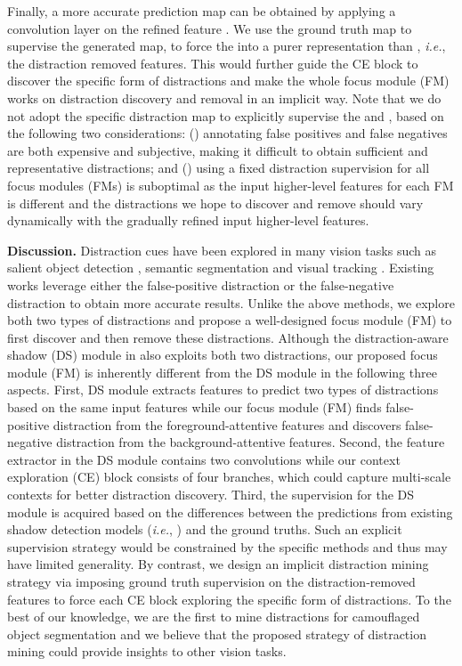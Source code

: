 \documentclass[final]{cvpr}
\begin{document}
Finally, a more accurate prediction map can be obtained by applying a convolution layer on the refined feature . We use the ground truth map to supervise the generated map, to force the  into a purer representation than , \emph{i.e.}, the distraction removed features. This would further guide the CE block to discover the specific form of distractions and make the whole focus module (FM) works on distraction discovery and removal in an implicit way.
Note that we do not adopt the specific distraction map to explicitly supervise the  and , based on the following two considerations: () annotating false positives and false negatives are both expensive and subjective, making it difficult to obtain sufficient and representative distractions; and () using a fixed distraction supervision for all focus modules (FMs) is suboptimal as the input higher-level features for each FM is different and the distractions we hope to discover and remove should vary dynamically with the gradually refined input higher-level features.

\textbf{Discussion.} Distraction cues have been explored in many vision tasks such as salient object detection \cite{Chen_2018_ECCV_ras,xiao2018deep_distraction}, semantic segmentation \cite{huang2017semantic} and visual tracking \cite{zhu2018distractor}. Existing works leverage either the false-positive distraction \cite{huang2017semantic,xiao2018deep_distraction,zhu2018distractor} or the false-negative distraction \cite{Chen_2018_ECCV_ras} to obtain more accurate results. Unlike the above methods, we explore both two types of distractions and propose a well-designed focus module (FM) to first discover and then remove these distractions.
Although the distraction-aware shadow (DS) module in \cite{zheng2019distraction} also exploits both two distractions, our proposed focus module (FM) is inherently different from the DS module in the following three aspects. First, DS module extracts features to predict two types of distractions based on the same input features while our focus module (FM) finds false-positive distraction from the foreground-attentive features and discovers false-negative distraction from the background-attentive features. Second, the feature extractor in the DS module contains two  convolutions while our context exploration (CE) block consists of four branches, which could capture multi-scale contexts for better distraction discovery. Third, the supervision for the DS module is acquired  based on the differences between the predictions from existing shadow detection models (\emph{i.e.}, \cite{Hu_2018_CVPR_dsc,Zhu_2018_ECCV_bdrar,Le_2018_ECCV_ad_net}) and the ground truths. Such an explicit supervision strategy would be constrained by the specific methods and thus may have limited generality. By contrast, we design an implicit distraction mining strategy via imposing ground truth supervision on the distraction-removed features to force each CE block exploring the specific form of distractions. To the best of our knowledge, we are the first to mine distractions for camouflaged object segmentation and we believe that the proposed strategy of distraction mining could provide insights to other vision tasks.
\end{document}
